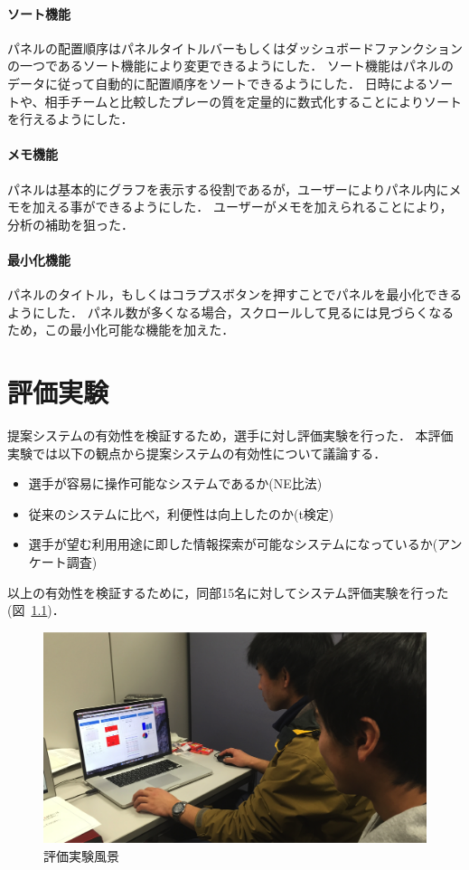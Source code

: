 \documentclass[sotsuron]{kuee}
\begin{document}
			\subsubsection{ソート機能}
			パネルの配置順序はパネルタイトルバーもしくはダッシュボードファンクションの一つであるソート機能により変更できるようにした．
			ソート機能はパネルのデータに従って自動的に配置順序をソートできるようにした．
			日時によるソートや、相手チームと比較したプレーの質を定量的に数式化することによりソートを行えるようにした．
			\subsubsection{メモ機能}
			パネルは基本的にグラフを表示する役割であるが，ユーザーによりパネル内にメモを加える事ができるようにした．
			ユーザーがメモを加えられることにより，分析の補助を狙った．
			\subsubsection{最小化機能}
			パネルのタイトル，もしくはコラプスボタンを押すことでパネルを最小化できるようにした．
			パネル数が多くなる場合，スクロールして見るには見づらくなるため，この最小化可能な機能を加えた．

\chapter{評価実験}
	提案システムの有効性を検証するため，選手に対し評価実験を行った．
	本評価実験では以下の観点から提案システムの有効性について議論する．
	\begin{itemize}
		\item 選手が容易に操作可能なシステムであるか(NE比法)
		\item 従来のシステムに比べ，利便性は向上したのか(t検定)
		\item 選手が望む利用用途に即した情報探索が可能なシステムになっているか(アンケート調査)
	\end{itemize}
	以上の有効性を検証するために，同部15名に対してシステム評価実験を行った(図~\ref{fig:experi})．
		\begin{figure}
			\begin{center}
				\includegraphics[width=\linewidth]{./png/experience.png}
			\end{center}
			\caption{評価実験風景}
	  		\label{fig:experi}
		\end{figure}
\end{document}
